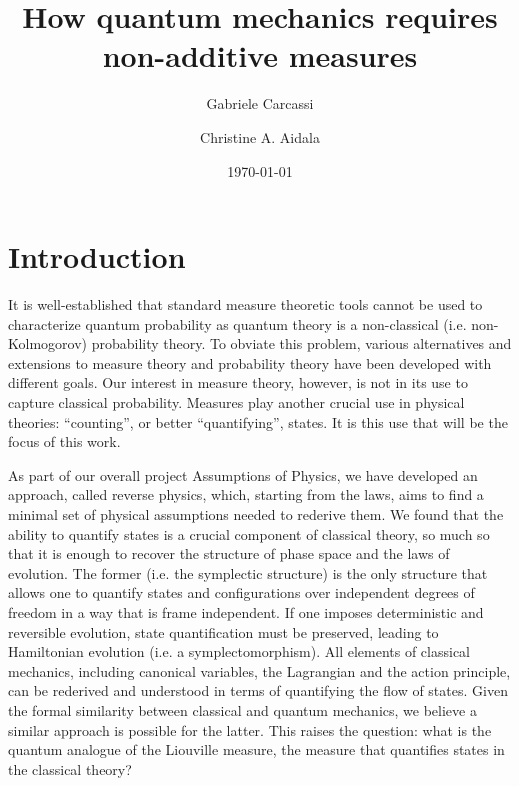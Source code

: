 \documentclass[10pt,twocolumn, nofootinbib]{revtex4-2}
\begin{document}
\title{How quantum mechanics requires non-additive measures}
\author{Gabriele Carcassi}
\author{Christine A. Aidala}

\date{\today}


\begin{abstract}
\end{abstract}

\maketitle

\section{Introduction}

It is well-established that standard measure theoretic tools cannot be used to characterize quantum probability as quantum theory is a non-classical (i.e. non-Kolmogorov) probability theory. To obviate this problem, various alternatives and extensions to measure theory and probability theory have been developed with different goals. Our interest in measure theory, however, is not in its use to capture classical probability. Measures play another crucial use in physical theories: ``counting'', or better ``quantifying'', states. It is this use that will be the focus of this work.

As part of our overall project Assumptions of Physics, we have developed an approach, called reverse physics, which, starting from the laws, aims to find a minimal set of physical assumptions needed to rederive them. We found that the ability to quantify states is a crucial component of classical theory, so much so that it is enough to recover the structure of phase space and the laws of evolution. The former (i.e. the symplectic structure) is the only structure that allows one to quantify states and configurations over independent degrees of freedom in a way that is frame independent. If one imposes deterministic and reversible evolution, state quantification must be preserved, leading to Hamiltonian evolution (i.e. a symplectomorphism). All elements of classical mechanics, including canonical variables, the Lagrangian and the action principle, can be rederived and understood in terms of quantifying the flow of states. Given the formal similarity between classical and quantum mechanics, we believe a similar approach is possible for the latter. This raises the question: what is the quantum analogue of the Liouville measure, the measure that quantifies states in the classical theory?
\end{document}
